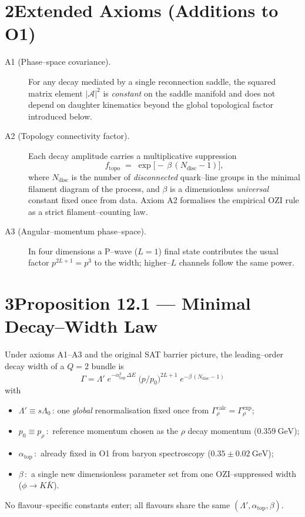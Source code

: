 \documentclass{article}
\begin{document}
\section*{2\quad Extended Axioms (Additions to O1)}
\begin{description}
  \item[A1 (Phase--space covariance).] For any decay mediated by a single
  reconnection saddle, the squared matrix element $|\mathcal A|^{2}$ is
  \emph{constant} on the saddle manifold and does not depend on daughter
  kinematics beyond the global topological factor introduced below.

  \item[A2 (Topology connectivity factor).] Each decay amplitude carries a multiplicative suppression
  \[
     f_{\text{topo}} \;=\;
     \exp\!\bigl[-\,\beta\,(N_{\text{disc}}-1)\bigr],
  \]
  where $N_{\text{disc}}$ is the number of \emph{disconnected} quark--line
  groups in the minimal filament diagram of the process, and $\beta$ is a
  dimensionless \emph{universal} constant fixed once from data.  Axiom A2
  formalises the empirical OZI rule as a strict filament--counting law.

  \item[A3 (Angular--momentum phase--space).] In four dimensions a P--wave
  ($L=1$) final state contributes the usual factor $p^{2L+1}=p^{3}$ to the
  width; higher--$L$ channels follow the same power.
\end{description}

\section*{3\quad Proposition 12.1 --- Minimal Decay--Width Law}
\begin{theorem*}
Under axioms A1--A3 and the original SAT barrier picture, the leading--order
decay width of a $Q=2$ bundle is
\[
  \boxed{\Gamma =
  \Lambda'\;
  e^{-\alpha_{\text{top}}^{2}\,\Delta E}\;
  \bigl(p/p_{0}\bigr)^{2L+1}\;
  e^{-\beta\,(N_{\text{disc}}-1)}}
  \tag{12.1}
\]
with
\begin{itemize}
  \item $\Lambda' \equiv s\Lambda_0$\,: one \emph{global} renormalisation fixed once from
        $\Gamma_\rho^{\text{calc}}=\Gamma_\rho^{\text{exp}}$;
  \item $p_0 \equiv p_\rho$\,:\ reference momentum chosen as the $\rho$ decay
        momentum ($0.359\ \text{GeV}$);
  \item $\alpha_{\text{top}}$\,:\ already fixed in O1 from baryon spectroscopy
        ($0.35\pm0.02\ \text{GeV}$);
  \item $\beta$\,:\ a single new dimensionless parameter set from one
        OZI--suppressed width ($\phi\to K\bar K$).
\end{itemize}
No flavour--specific constants enter; all flavours share the same
$(\Lambda',\alpha_{\text{top}},\beta)$.
\end{theorem*}
\end{document}
